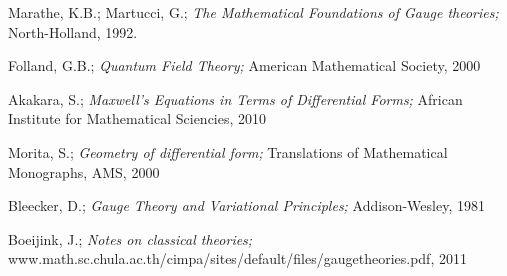 \begin{thebibliography}{A}

Marathe, K.B.; Martucci, G.;
\emph{The Mathematical Foundations of Gauge theories;}
North-Holland, 1992.

Folland, G.B.;
\emph{Quantum Field Theory;}
American Mathematical Society, 2000

Akakara, S.;
\emph{Maxwell's Equations in Terms of Differential Forms;}
African Institute for Mathematical Sciencies, 2010

Morita, S.;
\emph{Geometry of differential form;}
Translations of Mathematical Monographs, AMS, 2000

Bleecker, D.;
\emph{Gauge Theory and Variational Principles;}
Addison-Wesley, 1981

Boeijink, J.;
\emph{Notes on classical theories;} \\
www.math.sc.chula.ac.th/cimpa/sites/default/files/gaugetheories.pdf, 2011

\end{thebibliography}